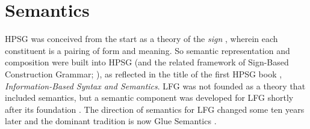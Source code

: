 

\section{Semantics}


HPSG  was conceived from the
start as  a theory of the \textit{sign} \citep{Saussure16a-Fr}, 
wherein each constituent is a pairing of form and meaning.  
So semantic representation and composition  were built into HPSG (and the 
related framework of Sign-Based Construction Grammar;
 \citealt{BS2012a-ed}), as reflected in the title of the first HPSG
book \citep{pollard;sag87}, \textit{Information-Based Syntax and
  Semantics}.  LFG was not founded as a theory that included semantics, but a semantic component was developed for LFG shortly after its foundation \citep{halvorsen83}.  The direction of semantics for LFG changed some ten years later and the dominant tradition is now Glue Semantics \citep{dalrymple;ea93,dalrymple99,Dalrymple2001a-u,asudeh-lpr,dalrymple;ea19}.  

